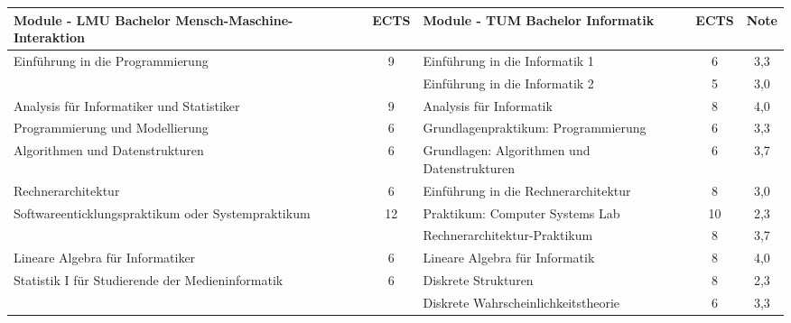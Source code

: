 \documentclass[11pt, a4paper]{awesome-cv}
\begin{document}

\newpage


\begin{table*}
  \scriptsize
  \centering
  \begin{tabularx}{\textwidth}{|X|c|X|c|c|}

    \hline
    Module - LMU Bachelor Mensch-Maschine-Interaktion      & ECTS & Module - TUM Bachelor Informatik               & ECTS & Note \\
    \hline
    Einführung in die Programmierung                       & 9    & Einführung in die Informatik 1                 & 6    & 3,3  \\
                                                           &      & Einführung in die Informatik 2                 & 5    & 3,0  \\

    \rowcolor{awesome!25}
    Analysis für Informatiker und Statistiker              & 9    & Analysis für Informatik                        & 8    & 4,0  \\

    Programmierung und Modellierung                        & 6    & Grundlagenpraktikum: Programmierung            & 6    & 3,3  \\

    \rowcolor{awesome!25}
    Algorithmen und Datenstrukturen                        & 6    & Grundlagen: Algorithmen und Datenstrukturen    & 6    & 3,7  \\

    Rechnerarchitektur                                     & 6    & Einführung in die Rechnerarchitektur           & 8    & 3,0  \\

    \rowcolor{awesome!25}
    Softwareenticklungspraktikum oder Systempraktikum      & 12   & Praktikum: Computer Systems Lab                & 10   & 2,3  \\
    \rowcolor{awesome!25}
                                                           &      & Rechnerarchitektur-Praktikum                   & 8    & 3,7  \\

    Lineare Algebra für Informatiker                       & 6    & Lineare Algebra für Informatik                 & 8    & 4,0  \\

    \rowcolor{awesome!25}
    Statistik I für Studierende der Medieninformatik       & 6    & Diskrete Strukturen                            & 8    & 2,3  \\
    \rowcolor{awesome!25}
                                                           &      & Diskrete Wahrscheinlichkeitstheorie            & 6    & 3,3  \\


\end{tabularx}
\end{table*}
\end{document}
